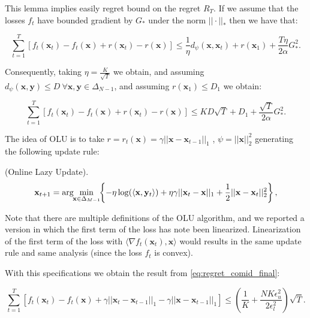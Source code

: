 This lemma implies easily regret bound on the regret $R_T$. If we assume that the losses $f_t$ have bounded gradient by $G_*$ under the norm $||\cdot||_*$ then we have that: 

\begin{equation}
\sum\limits_{t=1}^T[f_t(\mathbf x_t)-f_t(\mathbf x)+r(\mathbf x_t)-r(\mathbf x)]\le\frac{1}{\eta}d_\psi(\mathbf x,\mathbf x_t)+r(\mathbf x_1)+\frac{T\eta}{2\alpha}G_*^2.
\end{equation}

Consequently, taking $\eta=\frac{K}{\sqrt T}$ we obtain, and assuming $d_\psi(\mathbf x,\mathbf y)\le D\ \forall\mathbf x,\mathbf y\in\Delta_{N-1}$, and assuming $r(\mathbf x_1)\le D_1$ we obtain:

\begin{equation}\label{eq:regret_comid_final}
\sum\limits_{t=1}^T[f_t(\mathbf x_t)-f_t(\mathbf x)+r(\mathbf x_t)-r(\mathbf x)]\le KD\sqrt{T} + D_1+\frac{\sqrt{T}}{2\alpha}G_*^2.
\end{equation}

The idea of OLU is to take $r=r_t(\mathbf x)=\gamma||\mathbf x-\mathbf x_{t-1}||_1$ \cite{das2014online}, $\psi=||\mathbf x||_2^2$ generating the following update rule:

\begin{definition}(Online Lazy Update).\label{def:update_OLU}
\begin{equation}\label{eq:update_COMID}
    \mathbf{x}_{t+1}=\arg \hspace{-0.1cm} \min\limits_{\mathbf{x} \in \Delta_{M-1}} \hspace{-0.1cm} \left\{ -\eta\log(\langle \mathbf x,\mathbf y_t\rangle) + \eta \gamma ||\mathbf x_t-\mathbf x||_1 + \frac{1}{2}||\mathbf x-\mathbf x_t||^2_2 \right\},
\end{equation}

\end{definition}

Note that there are multiple definitions of the OLU algorithm, and we reported a version in which the first term of the loss has note been linearized. Linearization of the first term of the loss with $\langle\nabla f_t(\mathbf x_t),\mathbf x\rangle$ would results in the same update rule and same analysis (since the loss $f_t$ is convex).

With this specifications we obtain the result from \eqref{eq:regret_comid_final}:

\begin{equation}
\sum\limits_{t=1}^T[f_t(\mathbf x_t)-f_t(\mathbf x)+\gamma||\mathbf x_t-\mathbf x_{t-1}||_1-\gamma||\mathbf x-\mathbf x_{t-1}||_1]\le \left( \frac{1}{K} + \frac{N K \epsilon_u^2 }{2 \epsilon_l^2} \right) \sqrt{T}.
\end{equation}

